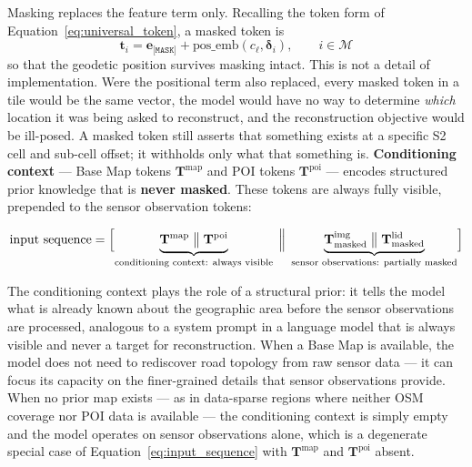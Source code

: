 \documentclass{book}
\begin{document}
Masking replaces the feature term only.  Recalling the token form
of Equation~\eqref{eq:universal_token}, a masked token is
\begin{equation}
  \mathbf{t}_i = \mathbf{e}_{\texttt{[MASK]}}
    + \text{pos\_emb}(c_\ell, \boldsymbol{\delta}_i),
  \qquad i \in \mathcal{M}
  \label{eq:masked_token}
\end{equation}
so that the geodetic position survives masking intact.  This is
not a detail of implementation.  Were the positional term also
replaced, every masked token in a tile would be the same vector,
the model would have no way to determine \emph{which} location it
was being asked to reconstruct, and the reconstruction objective
would be ill-posed.  A masked token still asserts that something
exists at a specific S2 cell and sub-cell offset; it withholds
only what that something is.
\textbf{Conditioning context} --- Base Map tokens
$\mathbf{T}^{\text{map}}$ and POI tokens $\mathbf{T}^{\text{poi}}$
--- encodes structured prior knowledge that is \textbf{never
masked}.  These tokens are always fully visible, prepended to
the sensor observation tokens:

\begin{equation}
  \text{input sequence} =
    \Bigl[
      \underbrace{
        \mathbf{T}^{\text{map}} \;\big\|\; \mathbf{T}^{\text{poi}}
      }_{\text{conditioning context: always visible}}
      \;\Big\|\;
      \underbrace{
        \mathbf{T}^{\text{img}}_{\text{masked}}
        \;\big\|\;
        \mathbf{T}^{\text{lid}}_{\text{masked}}
      }_{\text{sensor observations: partially masked}}
    \Bigr]
  \label{eq:input_sequence}
\end{equation}

The conditioning context plays the role of a structural prior: it
tells the model what is already known about the geographic area
before the sensor observations are processed, analogous to a system
prompt in a language model that is always visible and never a
target for reconstruction.  When a Base Map is available, the model
does not need to rediscover road topology from raw sensor data ---
it can focus its capacity on the finer-grained details that sensor
observations provide.  When no prior map exists --- as in
data-sparse regions where neither OSM coverage nor POI data is
available --- the conditioning context is simply empty and the
model operates on sensor observations alone, which is a degenerate
special case of Equation~\eqref{eq:input_sequence} with
$\mathbf{T}^{\text{map}}$ and $\mathbf{T}^{\text{poi}}$ absent.
\end{document}
